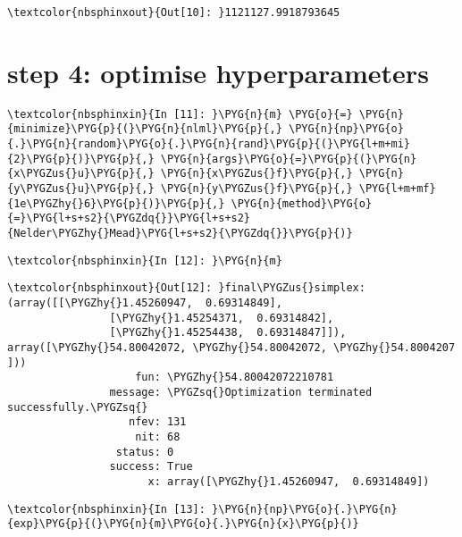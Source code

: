 \documentclass[letterpaper,10pt,english]{sphinxmanual}
\begin{document}
%
\begin{Verbatim}[commandchars=\\\{\}]
\textcolor{nbsphinxout}{Out[10]: }1121127.9918793645
\end{Verbatim}


\section{step 4: optimise hyperparameters}
\label{\detokenize{report/4-par_est:step-4:-optimise-hyperparameters}}
%
\begin{Verbatim}[commandchars=\\\{\}]
\textcolor{nbsphinxin}{In [11]: }\PYG{n}{m} \PYG{o}{=} \PYG{n}{minimize}\PYG{p}{(}\PYG{n}{nlml}\PYG{p}{,} \PYG{n}{np}\PYG{o}{.}\PYG{n}{random}\PYG{o}{.}\PYG{n}{rand}\PYG{p}{(}\PYG{l+m+mi}{2}\PYG{p}{)}\PYG{p}{,} \PYG{n}{args}\PYG{o}{=}\PYG{p}{(}\PYG{n}{x\PYGZus{}u}\PYG{p}{,} \PYG{n}{x\PYGZus{}f}\PYG{p}{,} \PYG{n}{y\PYGZus{}u}\PYG{p}{,} \PYG{n}{y\PYGZus{}f}\PYG{p}{,} \PYG{l+m+mf}{1e\PYGZhy{}6}\PYG{p}{)}\PYG{p}{,} \PYG{n}{method}\PYG{o}{=}\PYG{l+s+s2}{\PYGZdq{}}\PYG{l+s+s2}{Nelder\PYGZhy{}Mead}\PYG{l+s+s2}{\PYGZdq{}}\PYG{p}{)}
\end{Verbatim}

%
\begin{Verbatim}[commandchars=\\\{\}]
\textcolor{nbsphinxin}{In [12]: }\PYG{n}{m}
\end{Verbatim}

%
\begin{Verbatim}[commandchars=\\\{\}]
\textcolor{nbsphinxout}{Out[12]: }final\PYGZus{}simplex: (array([[\PYGZhy{}1.45260947,  0.69314849],
                [\PYGZhy{}1.45254371,  0.69314842],
                [\PYGZhy{}1.45254438,  0.69314847]]), array([\PYGZhy{}54.80042072, \PYGZhy{}54.80042072, \PYGZhy{}54.8004207 ]))
                    fun: \PYGZhy{}54.80042072210781
                message: \PYGZsq{}Optimization terminated successfully.\PYGZsq{}
                   nfev: 131
                    nit: 68
                 status: 0
                success: True
                      x: array([\PYGZhy{}1.45260947,  0.69314849])
\end{Verbatim}

%
\begin{Verbatim}[commandchars=\\\{\}]
\textcolor{nbsphinxin}{In [13]: }\PYG{n}{np}\PYG{o}{.}\PYG{n}{exp}\PYG{p}{(}\PYG{n}{m}\PYG{o}{.}\PYG{n}{x}\PYG{p}{)}
\end{Verbatim}
\end{document}
